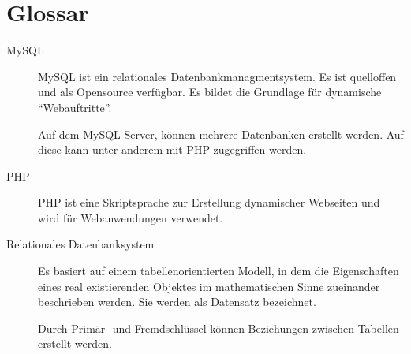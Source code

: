 

\chapter*{Glossar}

\begin{description}
 \item[MySQL]{MySQL ist ein relationales Datenbankmanagmentsystem. Es ist quelloffen und als Opensource verfügbar. Es bildet die Grundlage für dynamische "`Webauftritte"'}. 
 
 Auf dem MySQL-Server, können mehrere Datenbanken erstellt werden. Auf diese kann unter anderem mit PHP zugegriffen werden.
 \item[PHP]PHP ist eine Skriptsprache zur Erstellung dynamischer Webseiten und wird für Webanwendungen verwendet.
 \item[Relationales Datenbanksystem] Es basiert auf einem tabellenorientierten Modell, in dem die Eigenschaften eines real existierenden Objektes im mathematischen Sinne zueinander beschrieben werden. Sie werden als Datensatz bezeichnet.
 
 Durch Primär- und Fremdschlüssel können Beziehungen zwischen Tabellen erstellt werden.
 
\end{description}